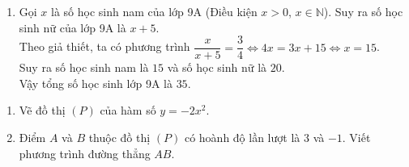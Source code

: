 \begin{ex}
{\begin{enumerate}
					Vậy hệ phương trình đã cho có nghiệm $(x; y) = (-1; 1)$.
			\item Gọi $x$ là số học sinh nam của lớp 9A (Điều kiện $x > 0$, $x \in \mathbb{N}$). Suy ra số học sinh nữ của lớp 9A là $x + 5$.\\
					Theo giả thiết, ta có phương trình $\dfrac{x}{x + 5} = \dfrac{3}{4} \Leftrightarrow 4x = 3x + 15 \Leftrightarrow x = 15$.\\
					Suy ra số học sinh nam là $15$ và số học sinh nữ là $20$.\\
					Vậy tổng số học sinh lớp 9A là $35$.
		\end{enumerate}
	}
\end{ex}

\begin{ex}%
	\begin{enumerate}
		\item Vẽ đồ thị $(P)$ của hàm số $y = -2x^2$.
		\item Điểm $A$ và $B$ thuộc đồ thị $(P)$ có hoành độ lần lượt là $3$ và $-1$. Viết phương trình đường thẳng $AB$.
	\end{enumerate}
\end{ex}

